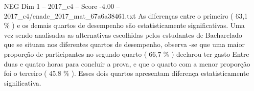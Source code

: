 \begin{textsample}{NEG Dim 1 – 2017\_c4 – Score -4.00 – 2017\_c4/enade\_2017\_mat\_67a6a38461.txt}
As diferenças entre o primeiro ( 63,1 \% ) e os demais quartos de desempenho são estatisticamente significativas.
Uma vez sendo analisadas as alternativas escolhidas pelos estudantes de Bacharelado que se situam nos diferentes quartos de desempenho, observa -se que uma maior proporção de participantes no segundo quarto ( 66,7 \% ) declarou ter gasto Entre duas e quatro horas para concluir a prova, e que o quarto com a menor proporção foi o terceiro ( 45,8 \% ).
Esses dois quartos apresentam diferença estatisticamente significativa.

\end{textsample}
